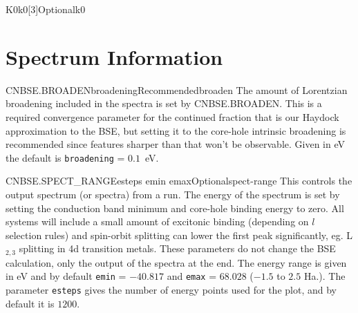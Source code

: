 \documentclass[11pt]{report}
\begin{document}
\begin{Card}{K0}{k0[3]}{Optional}{k0}
\section{Spectrum Information}
\label{sec:Spectrum-Information}
\begin{Card}{CNBSE.BROADEN}{broadening}{Recommended}{broaden}
The amount of Lorentzian broadening included in the spectra is set by CNBSE.BROADEN. This is a required convergence parameter for the continued fraction that is our Haydock approximation to the BSE, but setting it to the core-hole intrinsic broadening is recommended since features sharper than that won't be observable. Given in eV the default is \texttt{broadening} = $0.1$~eV.
\end{Card}

\begin{Card}{CNBSE.SPECT\_RANGE}{esteps emin emax}{Optional}{spect-range}
This controls the output spectrum (or spectra) from a run. The energy of the spectrum is set by setting the conduction band minimum and core-hole binding energy to zero. All systems will include a small amount of excitonic binding (depending on $l$ selection rules) and spin-orbit splitting can lower the first peak significantly, eg. L$_{2,3}$ splitting in 4d transition metals. These parameters do not change the BSE calculation, only the output of the spectra at the end. The energy range is given in eV and by default \texttt{emin} = $-40.817$ and \texttt{emax} = $68.028$ ($-1.5$ to $2.5$ Ha.). The parameter \texttt{esteps} gives the number of energy points used for the plot, and by default it is $1200$.
\end{Card}








%


\end{Card}
\end{document}
